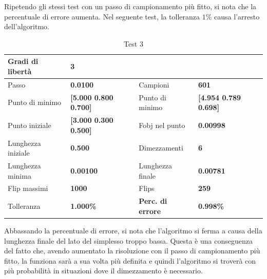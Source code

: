 \documentclass[a4paper, 11pt]{article}
\begin{document}
\noindent
Ripetendo gli stessi test con un passo di campionamento più fitto, si nota che
la percentuale di errore aumenta. Nel seguente test, la tolleranza $1\%$ causa
l'arresto dell'algoritmo.

\begin{table}[h] 
	\caption{Test 3}
	\begin{center}
	\begin{tabular}{|l|l|l|l|} 
	\hline 
	Gradi di libertà & \textbf{3} &  &  \\ \hline 
	Passo & \textbf{0.0100} & Campioni & \textbf{601} \\ \hline 
	Punto di minimo & \textbf{{[}5.000 0.800 0.700{]}} & Punto di minimo & \textbf{{[}4.954 0.789 0.698{]}} \\ \hline 
	Punto iniziale & \textbf{{[}3.000 0.300 0.500{]}} & Fobj nel punto & \textbf{0.00998} \\ \hline 
	Lunghezza iniziale & \textbf{0.500} & Dimezzamenti & \textbf{6} \\ \hline 
	Lunghezza minima & \textbf{0.00100} & Lunghezza finale & \textbf{0.00781} \\ \hline
	Flip massimi & \textbf{1000} & Flips & \textbf{259} \\ \hline 
	Tolleranza & \textbf{1.000\%} & \textbf{Perc. di errore} & \textbf{0.998\%} \\ \hline 
	\end{tabular} 
	\end{center}
	\end{table}

\noindent
Abbassando la percentuale di errore, si nota che l'algoritmo si ferma a causa
della lunghezza finale del lato del simplesso troppo bassa. Questa è una
conseguenza del fatto che, avendo aumentato la risoluzione con il passo di
campionamento più fitto, la funziona sarà a sua volta più definita e quindi
l'algoritmo si troverà con più probabilità in situazioni dove il dimezzamento è necessario.
\end{document}
